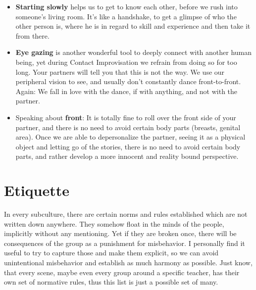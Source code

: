 \begin{itemize}
    \item \textbf{Starting slowly} helps us to get to know each other, before we rush into someone's living room.
    It's like a handshake, to get a glimpse of who the other person is, where he is in regard to skill and experience and then take it from there.
    \item \textbf{Eye gazing} is another wonderful tool to deeply connect with another human being, yet during Contact Improvisation we refrain from doing so for too long.
     Your partners will tell you that this is not the way.
     We use our peripheral vision to see, and usually don't constantly dance front-to-front.
     Again: We fall in love with the dance, if with anything, and not with the partner.
    \item Speaking about \textbf{front}: It is totally fine to roll over the front side of your partner, and there is no need to avoid certain body parts (breasts, genital area).
    Once we are able to depersonalize the partner, seeing it as a physical object and letting go of the stories, there is no need to avoid certain body parts, and rather develop a more innocent and reality bound perspective.
\end{itemize}

\section{Etiquette}\label{sec:etiquette}

In every subculture, there are certain norms and rules established which are not written down anywhere.
They somehow float in the minds of the people, implicitly without any mentioning.
Yet if they are broken once, there will be consequences of the group as a punishment for misbehavior.
I personally find it useful to try to capture those and make them explicit, so we can avoid unintentional misbehavior and establish as much harmony as possible.
Just know, that every scene, maybe even every group around a specific teacher, has their own set of normative rules, thus this list is just a possible set of many.

